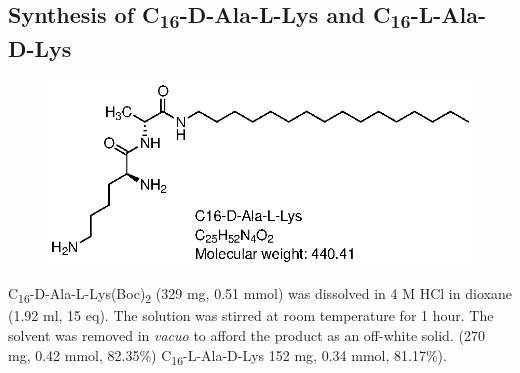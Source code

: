 \subsection*{Synthesis of C\textsubscript{16}-D-Ala-L-Lys and  C\textsubscript{16}-L-Ala-D-Lys }
\begin{figure}[ht!]
\centering
\includegraphics{Figures/C16-D-Ala-L-Lys.eps}
\end{figure}
C\textsubscript{16}-D-Ala-L-Lys(Boc)\textsubscript{2} (329 mg, 0.51 mmol) was dissolved in 4 M HCl in dioxane (1.92 ml, 15 eq). The solution was stirred at room temperature for 1 hour. The solvent was removed in \textit{vacuo} to afford the product as an off-white solid. (270 mg, 0.42 mmol, 82.35\%) C\textsubscript{16}-L-Ala-D-Lys 152 mg, 0.34 mmol, 81.17\%). 

